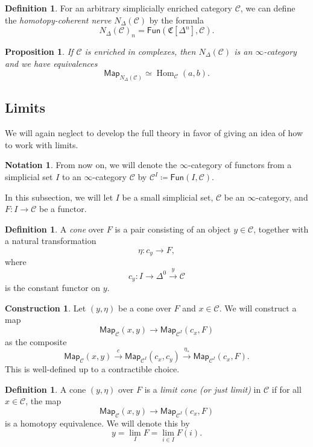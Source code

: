 \documentclass[10pt]{amsart}
\newtheorem{prop}[thm]{Proposition}
\theoremstyle{definition}
\newtheorem{defn}[thm]{Definition}
\newtheorem{con}[thm]{Construction}
\newtheorem{notn}[thm]{Notation}
\theoremstyle{remark}
\theoremstyle{plain}
\theoremstyle{definition}
\theoremstyle{remark}
\newcommand{\mc}[1]{\mathcal{#1}}
\newcommand{\mf}[1]{\mathfrak{#1}}
\newcommand{\ms}[1]{\mathsf{#1}}
\newcommand{\1}{\mathbf{1}}
\newcommand{\2}{\mathbf{2}}
\newcommand{\3}{\mathbf{3}}
\DeclareMathOperator{\Hom}{Hom}
\begin{document}
\begin{defn}
    For an arbitrary simplicially enriched category $\mc{C}$, we can define the \textit{homotopy-coherent nerve} $N_{\Delta}(\mc{C})$ by the formula
    \[ N_{\Delta}(\mc{C})_n = \ms{Fun}(\mf{C}[\Delta^n], \mc{C}). \]
\end{defn}

\begin{prop}
    If $\mc{C}$ is enriched in complexes, then $N_{\Delta}(\mc{C})$ is an $\infty$-category and we have equivalences
    \[ \ms{Map}_{N_{\Delta}(\mc{C})} \simeq \Hom_{\mc{C}}(a,b). \]
\end{prop}

\subsection{Limits}%
\label{sub:Limits}

We will again neglect to develop the full theory in favor of giving an idea of how to work with limits.

\begin{notn}
    From now on, we will denote the $\infty$-category of functors from a simplicial set $I$ to an $\infty$-category $\mc{C}$ by $\mc{C}^I \coloneqq \ms{Fun}(I, \mc{C})$.
\end{notn}

In this subsection, we will let $I$ be a small simplicial set, $\mc{C}$ be an $\infty$-category, and $F \colon I \to \mc{C}$ be a functor.

\begin{defn}
    A \textit{cone} over $F$ is a pair consisting of an object $y \in \mc{C}$, together with a natural transformation 
    \[ \eta \colon c_y \to F, \]
    where 
    \[ c_y \colon I \to \Delta^0 \xrightarrow{y} \mc{C} \]
    is the constant functor on $y$.
\end{defn}

\begin{con}
    Let $(y, \eta)$ be a cone over $F$ and $x \in \mc{C}$. We will construct a map
    \[ \ms{Map}_{\mc{C}}(x,y) \to \ms{Map}_{\mc{C}^I} (c_x, F) \]
    as the composite
    \[ \ms{Map}_{\mc{C}}(x,y) \xrightarrow{c} \ms{Map}_{\mc{C}^I} (c_x, c_y) \xrightarrow{\eta_*} \ms{Map}_{\mc{C}^I} (c_x, F). \]
    This is well-defined up to a contractible choice.
\end{con}

\begin{defn}
    A cone $(y, \eta)$ over $F$ is a \textit{limit cone (or just limit)} in $\mc{C}$ if for all $x \in \mc{C}$, the map
    \[ \ms{Map}_{\mc{C}}(x,y) \to \ms{Map}_{\mc{C}^I}(c_x, F) \]
    is a homotopy equivalence. We will denote this by
    \[ y = \lim_I F = \lim_{i \in I} F(i). \]
\end{defn}
\end{document}
